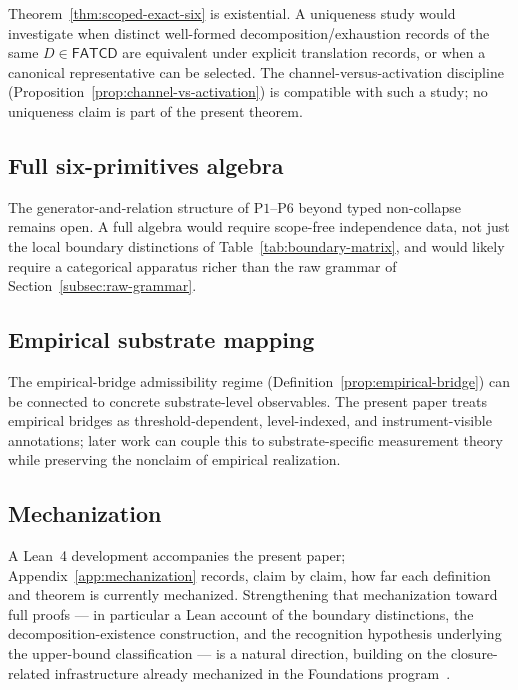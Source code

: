 \documentclass[11pt]{article}
\theoremstyle{definition}
\newcommand{\FATCD}{\ensuremath{\mathsf{FATCD}}}
\newcommand{\Pone}{\ensuremath{\mathrm{P1}}}
\newcommand{\Psix}{\ensuremath{\mathrm{P6}}}
\begin{document}
Theorem~\ref{thm:scoped-exact-six} is existential. A uniqueness study
would investigate when distinct well-formed decomposition/exhaustion
records of the same \(D \in \FATCD{}\) are equivalent under explicit
translation records, or when a canonical representative can be
selected. The channel-versus-activation discipline
(Proposition~\ref{prop:channel-vs-activation}) is compatible with
such a study; no uniqueness claim is part of the present theorem.

\subsection{Full six-primitives algebra}\label{subsec:future-algebra}

The generator-and-relation structure of \Pone{}--\Psix{} beyond
typed non-collapse remains open. A full algebra would require
scope-free independence data, not just the local boundary
distinctions of Table~\ref{tab:boundary-matrix}, and would likely
require a categorical apparatus richer than the raw grammar of
Section~\ref{subsec:raw-grammar}.

\subsection{Empirical substrate mapping}\label{subsec:future-substrate}

The empirical-bridge admissibility regime
(Definition~\ref{prop:empirical-bridge}) can be connected to
concrete substrate-level observables. The present paper treats
empirical bridges as threshold-dependent, level-indexed, and
instrument-visible annotations; later work can couple this to
substrate-specific measurement theory while preserving the nonclaim
of empirical realization.

\subsection{Mechanization}\label{subsec:future-mechanization}

A Lean~4 development accompanies the present paper;
Appendix~\ref{app:mechanization} records, claim by claim, how far each definition
and theorem is currently mechanized. Strengthening that mechanization toward full
proofs --- in particular a Lean account of the boundary distinctions, the
decomposition-existence construction, and the recognition hypothesis underlying
the upper-bound classification --- is a natural direction, building on the
closure-related infrastructure already mechanized in the Foundations
program~\citep{Tsiokos2026SixBirdsFoundations,DeMouraUllrich2021}.
\end{document}
